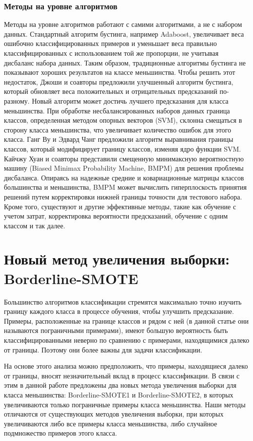 \documentclass{article}
\begin{document}
\subsubsection{Методы на уровне алгоритмов }
 Методы на уровне алгоритмов работают с самими алгоритмами, а не с набором данных. Стандартный алгоритм бустинга, например Adaboost, увеличивает веса ошибочно классифицированных примеров и уменьшает веса правильно классифицированных с использованием той же пропорции, не учитывая дисбаланс набора данных. Таким образом, традиционные алгоритмы бустинга не показывают хороших результатов на классе меньшинства. Чтобы решить этот недостаток, Джоши и соавторы предложили улучшенный алгоритм бустинга, который обновляет веса положительных и отрицательных предсказаний по-разному. Новый алгоритм может достичь лучшего предсказания для класса меньшинства. При обработке несбалансированных наборов данных граница классов, определенная методом опорных векторов (SVM), склонна смещаться в сторону класса меньшинства, что увеличивает количество ошибок для этого класса. Ганг Ву и Эдвард Чанг предложили алгоритм выравнивания границы классов, который модифицирует границу классов, изменяя ядро функции SVM. Кайчжу Хуан и соавторы представили смещенную минимаксную вероятностную машину (Biased Minimax Probability Machine, BMPM) для решения проблемы дисбаланса. Опираясь на надежные средние и ковариационные матрицы классов большинства и меньшинства, BMPM может вычислить гиперплоскость принятия решений путем корректировки нижней границы точности для тестового набора. Кроме того, существуют и другие эффективные методы, такие как обучение с учетом затрат, корректировка вероятности предсказаний, обучение с одним классом и так далее.
\section{Новый метод увеличения выборки: Borderline-SMOTE }
 Большинство алгоритмов классификации стремятся максимально точно изучить границу каждого класса в процессе обучения, чтобы улучшить предсказание. Примеры, расположенные на границе классов и рядом с ней (в данной статье они называются пограничными примерами), имеют большую вероятность быть классифицированными неверно по сравнению с примерами, находящимися далеко от границы. Поэтому они более важны для задачи классификации.

На основе этого анализа можно предположить, что примеры, находящиеся далеко от границы, вносят незначительный вклад в процесс классификации. В связи с этим в данной работе предложены два новых метода увеличения выборки для класса меньшинства: Borderline-SMOTE1 и Borderline-SMOTE2, в которых увеличиваются только пограничные примеры класса меньшинства. Наши методы отличаются от существующих методов увеличения выборки, при которых увеличиваются либо все примеры класса меньшинства, либо случайное подмножество примеров этого класса.
\end{document}
